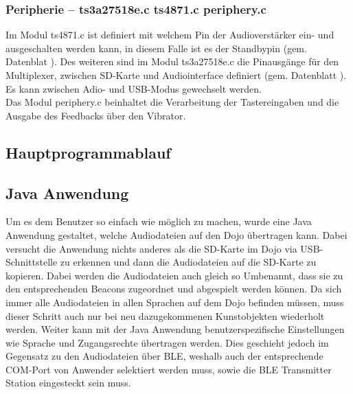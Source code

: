 \subsubsection{Peripherie -- ts3a27518e.c ts4871.c periphery.c }

Im Modul ts4871.c ist definiert mit welchem Pin der Audioverstärker ein- und ausgeschalten werden kann, in diesem Falle ist es der Standbypin (gem. Datenblat \cite{TS4871}). Des weiteren sind im Modul ts3a27518e.c die Pinausgänge für den Multiplexer, zwischen SD-Karte und Audiointerface definiert (gem. Datenblatt \cite{TS3A27518E}). Es kann zwischen Adio- und USB-Modus gewechselt werden.\\
Das Modul periphery.c beinhaltet die Verarbeitung der Tastereingaben und die Ausgabe des Feedbacks über den Vibrator.

\subsection{Hauptprogrammablauf}


\subsection{Java Anwendung}

Um es dem Benutzer so einfach wie möglich zu machen, wurde eine Java Anwendung gestaltet, welche Audiodateien auf den Dojo übertragen kann. Dabei versucht die Anwendung nichts anderes als die SD-Karte im Dojo via USB-Schnittstelle zu erkennen und dann die Audiodateien auf die SD-Karte zu kopieren. Dabei werden die Audiodateien auch gleich so Umbenannt, dass sie zu den entsprechenden Beacons zugeordnet und abgespielt werden können. Da sich immer alle Audiodateien in allen Sprachen auf dem Dojo befinden müssen, muss dieser Schritt auch nur bei neu dazugekommenen Kunstobjekten wiederholt werden. Weiter kann mit der Java Anwendung benutzerspezifische Einstellungen wie Sprache und Zugangsrechte übertragen werden. Dies geschieht jedoch im Gegensatz zu den Audiodateien über BLE, weshalb auch der entsprechende COM-Port von Anwender selektiert werden muss, sowie die BLE Transmitter Station eingesteckt sein muss.

\newpage

